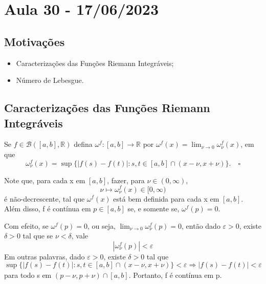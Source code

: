 \documentclass[../analysis_notes.tex]{subfiles}
\begin{document}
\section{Aula 30 - 17/06/2023}
\subsection{Motivações}
\begin{itemize}
	\item Caracterizações das Funções Riemann Integráveis;
	\item Número de Lebesgue.
\end{itemize}
\subsection{Caracterizações das Funções Riemann Integráveis}
\begin{def*}
	Se \(f\in \mathcal{B}([a, b], \mathbb{R})\) defina \(\omega ^{f}:[a, b]\rightarrow \mathbb{R}\) por \(\omega ^{f}(x)=\lim_{\nu\to 0}\omega_{\nu}^{f}(x)\), em que
	\[
		\omega _{\nu}^{f}(x)=\sup_{}\{|f(s)-f(t)|: s, t\in [a, b]\cap (x-\nu, x+\nu)\}. \quad \square
	\]
\end{def*}
Note que, para cada x em \([a, b]\), fazer, para \(\nu\in(0, \infty)\),
\[
	\nu \mapsto \omega_{\nu}^{f}(x)\in [0, \infty)
\]
é não-decrescente, tal que \(\omega ^{f}(x)\) está bem definida para cada x em \([a, b]\). Além disso, f é contínua em \(p\in[a, b]\) se, e somente se, \(\omega^{f}(p)=0.\)

Com efeito, se \(\omega ^{f}(p)=0\), ou seja, \(\lim_{\nu\to 0}\omega_{\nu}^{f}(p)=0\), então dado \(\varepsilon >0\), existe \(\delta >0\) tal que se \(\nu<\delta \), vale
\[
	|\omega _{\nu}^{f}(p)|<\varepsilon
\]
Em outras palavras, dado \(\varepsilon >0\), existe \(\delta >0\) tal que
\[
	\sup_{}\{|f(s)-f(t)|:s, t\in [a, b]\cap (x-\nu, x+\nu)\}<\varepsilon \Rightarrow |f(s)-f(t)|<\varepsilon
\]
para todo s em \((p-\nu, p+\nu)\cap [a, b]\). Portanto, f é contínua em p.
\end{document}
